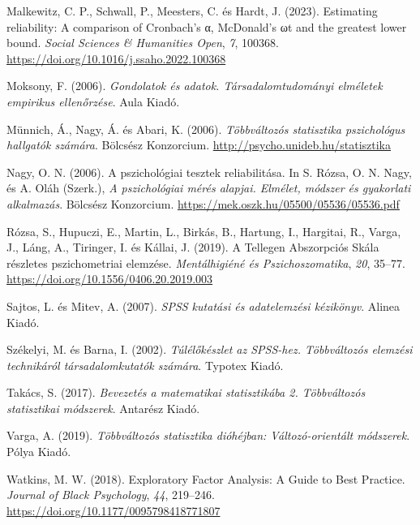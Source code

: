 \documentclass[
  letterpaper,
]{krantz}
\newlength{\cslhangindent}
\newlength{\cslentryspacingunit} %
\newenvironment{CSLReferences}[2] %
 {%
  \setlength{\parindent}{0pt}
  \ifodd #1
  \let\oldpar\par
  \def\par{\hangindent=\cslhangindent\oldpar}
  \fi
  \setlength{\parskip}{#2\cslentryspacingunit}
 }%
 {}
\begin{document}
\begin{CSLReferences}{1}{0}
\leavevmode{}%
Malkewitz, C. P., Schwall, P., Meesters, C. és Hardt, J. (2023).
Estimating reliability: A comparison of Cronbach's α, McDonald's ωt and
the greatest lower bound. \emph{Social Sciences \& Humanities Open},
\emph{7}, 100368. \url{https://doi.org/10.1016/j.ssaho.2022.100368}

\leavevmode{}%
Moksony, F. (2006). \emph{Gondolatok és adatok. Társadalomtudományi
elméletek empirikus ellenőrzése}. Aula Kiadó.

\leavevmode{}%
Münnich, Á., Nagy, Á. és Abari, K. (2006). \emph{Többváltozós
statisztika pszichológus hallgatók számára}. Bölcsész Konzorcium.
\url{http://psycho.unideb.hu/statisztika}

\leavevmode{}%
Nagy, O. N. (2006). A pszichológiai tesztek reliabilitása. In S. Rózsa,
O. N. Nagy, és A. Oláh (Szerk.), \emph{A pszichológiai mérés alapjai.
Elmélet, módszer és gyakorlati alkalmazás}. Bölcsész Konzorcium.
\url{https://mek.oszk.hu/05500/05536/05536.pdf}

\leavevmode{}%
Rózsa, S., Hupuczi, E., Martin, L., Birkás, B., Hartung, I., Hargitai,
R., Varga, J., Láng, A., Tiringer, I. és Kállai, J. (2019). A Tellegen
Abszorpciós Skála részletes pszichometriai elemzése. \emph{Mentálhigiéné
és Pszichoszomatika}, \emph{20}, 35--77.
\url{https://doi.org/10.1556/0406.20.2019.003}

\leavevmode{}%
Sajtos, L. és Mitev, A. (2007). \emph{SPSS kutatási és adatelemzési
kézikönyv}. Alinea Kiadó.

\leavevmode{}%
Székelyi, M. és Barna, I. (2002). \emph{Túlélőkészlet az SPSS-hez.
Többváltozós elemzési technikáról társadalomkutatók számára}. Typotex
Kiadó.

\leavevmode{}%
Takács, S. (2017). \emph{Bevezetés a matematikai statisztikába 2.
Többváltozós statisztikai módszerek}. Antarész Kiadó.

\leavevmode{}%
Varga, A. (2019). \emph{Többváltozós statisztika dióhéjban:
Változó-orientált módszerek}. Pólya Kiadó.

\leavevmode{}%
Watkins, M. W. (2018). Exploratory Factor Analysis: A Guide to Best
Practice. \emph{Journal of Black Psychology}, \emph{44}, 219--246.
\url{https://doi.org/10.1177/0095798418771807}

\end{CSLReferences}



\backmatter
\printindex
\end{document}
